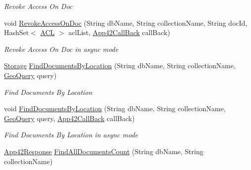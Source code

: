 \begin{DoxyCompactItemize}
\begin{DoxyCompactList}\small\item\em Revoke Access On Doc \end{DoxyCompactList}\item 
void \hyperlink{classcom_1_1shephertz_1_1app42_1_1paas_1_1sdk_1_1csharp_1_1storage_1_1_storage_service_a1fd882ac327bd4bcd5d10e90dcbd1989}{Revoke\+Access\+On\+Doc} (String db\+Name, String collection\+Name, String doc\+Id, Hash\+Set$<$ \hyperlink{classcom_1_1shephertz_1_1app42_1_1paas_1_1sdk_1_1csharp_1_1_a_c_l}{A\+C\+L} $>$ acl\+List, \hyperlink{interfacecom_1_1shephertz_1_1app42_1_1paas_1_1sdk_1_1csharp_1_1_app42_call_back}{App42\+Call\+Back} call\+Back)
\begin{DoxyCompactList}\small\item\em Revoke Access On Doc in async mode \end{DoxyCompactList}\item 
\hyperlink{classcom_1_1shephertz_1_1app42_1_1paas_1_1sdk_1_1csharp_1_1storage_1_1_storage}{Storage} \hyperlink{classcom_1_1shephertz_1_1app42_1_1paas_1_1sdk_1_1csharp_1_1storage_1_1_storage_service_ae8a1bf2c7441c5a1174f95a542d8ef65}{Find\+Documents\+By\+Location} (String db\+Name, String collection\+Name, \hyperlink{classcom_1_1shephertz_1_1app42_1_1paas_1_1sdk_1_1csharp_1_1storage_1_1_geo_query}{Geo\+Query} query)
\begin{DoxyCompactList}\small\item\em Find Documents By Location \end{DoxyCompactList}\item 
void \hyperlink{classcom_1_1shephertz_1_1app42_1_1paas_1_1sdk_1_1csharp_1_1storage_1_1_storage_service_af0d6b092bc1e891d67d2177d741d5749}{Find\+Documents\+By\+Location} (String db\+Name, String collection\+Name, \hyperlink{classcom_1_1shephertz_1_1app42_1_1paas_1_1sdk_1_1csharp_1_1storage_1_1_geo_query}{Geo\+Query} query, \hyperlink{interfacecom_1_1shephertz_1_1app42_1_1paas_1_1sdk_1_1csharp_1_1_app42_call_back}{App42\+Call\+Back} call\+Back)
\begin{DoxyCompactList}\small\item\em Find Documents By Location in async mode \end{DoxyCompactList}\item 
\hyperlink{classcom_1_1shephertz_1_1app42_1_1paas_1_1sdk_1_1csharp_1_1_app42_response}{App42\+Response} \hyperlink{classcom_1_1shephertz_1_1app42_1_1paas_1_1sdk_1_1csharp_1_1storage_1_1_storage_service_a554d88546e435098d237e01f3d607537}{Find\+All\+Documents\+Count} (String db\+Name, String collection\+Name)

\end{DoxyCompactItemize}
